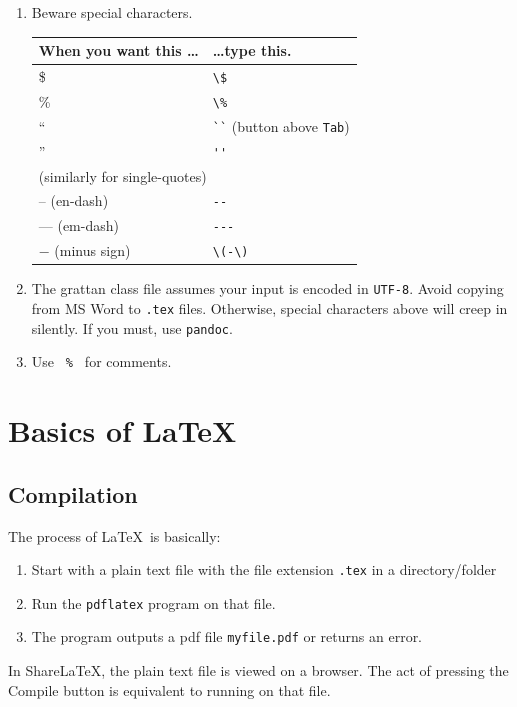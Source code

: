 \documentclass[a4paper,11pt]{scrartcl}\usepackage[]{graphicx}\usepackage[]{color}
\let\oldsection\section
\renewcommand\section{\clearpage\oldsection}
\newcommand{\Code}[1]{\Colorbox{gray!10}{\lstinline!#1!}}
\begin{document}
\begin{enumerate}
  \item Beware special characters. 
  \begin{table}[h]
   \centering
   \begin{tabular}{ll}
   \toprule
   \textbf{When you want this \dots} & \textbf{\dots type this.} \\
   \midrule
   \$ & \verb=\$= \\
   \% & \verb=\%= \\
   `` & \verb=``= (button above \verb=Tab=) \\
   '' & \verb=''= \\
   \multicolumn{2}{l}{(similarly for single-quotes)} \\ 
   -- (en-dash) & \verb=--=  \\
   --- (em-dash) & \verb=---=  \\
   \(-\) (minus sign) & \verb=\(-\)= \\
   \bottomrule   
  \end{tabular}
  \end{table}

  


  \item The grattan class file assumes your input is encoded in \texttt{UTF-8}. Avoid copying from MS Word to \verb=.tex= files. Otherwise, special characters above will creep in silently. If you must, use \verb=pandoc=.
  \item Use \verb= % = for comments.
 \end{enumerate}
 \section{Basics of \textrm{\LaTeX}}
 \subsection{Compilation}
 The process of \LaTeX\ is basically:
 \begin{enumerate}
  \item Start with a plain text file with the file extension \verb=.tex= in a directory/folder
  \item Run the \verb=pdflatex= program on that file. 
  \item The program outputs a pdf file \lstinline!myfile.pdf! or returns an error.
 \end{enumerate}

 In ShareLaTeX, the plain text file is viewed on a browser. The act of pressing the Compile button is equivalent to running \Code{pdflatex} on that file.
\end{document}
